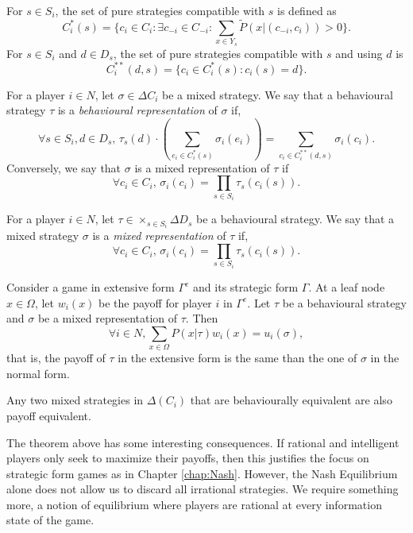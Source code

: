 \begin{definition}
For $s \in S_i$,  the set of pure strategies compatible with $s$ is defined as 
$$ C_i^*(s) = \{c_i \in C_i : \exists c_{-i} \in C_{-i} : \sum_{x \in Y_s} \tilde P(x | (c_{-i}, c_i)) > 0\}.$$
For $s \in S_i$ and $d \in D_s$, the set of pure strategies compatible with $s$ and using $d$ is 
$$ C_i^{**}(d,s) = \{c_i \in C_i^*(s) : c_i(s) = d\}. $$
\end{definition}

\begin{definition}
For a player $i \in N$, let $\sigma \in \Delta C_i$ be a mixed strategy.
We say that a behavioural strategy $\tau$ is a \emph{behavioural representation} of $\sigma$ if, 
$$ \forall s \in S_i, d \in D_s, \, \tau_s(d)\cdot\left ( \sum_{e_i \in C_i^*(s)} \sigma_i(e_i) \right ) = \sum_{c_i \in C_i^{**}(d,s)} \sigma_i(c_i). $$
Conversely, we say that $\sigma$ is a mixed representation of $\tau$ if 
$$\forall c_i \in C_i, \, \sigma_i(c_i) = \prod_{s \in S_i} \tau_s(c_i(s)).$$
\end{definition}

\begin{definition}
For a player $i \in N$, let $\tau \in \times_{s \in S_i} \Delta  D_s$ be a behavioural strategy.
We say that a mixed strategy $\sigma$ is a \emph{mixed representation} of $\tau$ if, 
$$\forall c_i \in C_i, \, \sigma_i(c_i) = \prod_{s \in S_i} \tau_s(c_i(s)).$$
\end{definition}

\begin{proposition}
Consider a game in extensive form $\Gamma^e$ and its strategic form $\Gamma$. 
At a leaf node $x \in \Omega$, let $w_i(x)$ be the payoff for player $i$ in $\Gamma^e$. 
Let $\tau$ be a behavioural strategy and $\sigma$ be a mixed representation of $\tau$.
Then
$$ \forall i \in N, \sum_{x \in \Omega} P(x | \tau) w_i(x) = u_i(\sigma),$$
that is, the payoff of $\tau$ in the extensive form is the same than the one of $\sigma$ in the normal form.
\end{proposition}

\begin{theorem}[Kuhn]
Any two mixed strategies in $\Delta(C_i)$ that are behaviourally equivalent are also payoff equivalent.
\end{theorem}

The theorem above has some interesting consequences. If rational and intelligent players only seek to maximize their payoffs, then this justifies the focus on strategic form games as in Chapter \ref{chap:Nash}. However, the Nash Equilibrium alone does not allow us to discard all irrational strategies. We require something more, a notion of equilibrium where players are rational at every information state of the game. 

